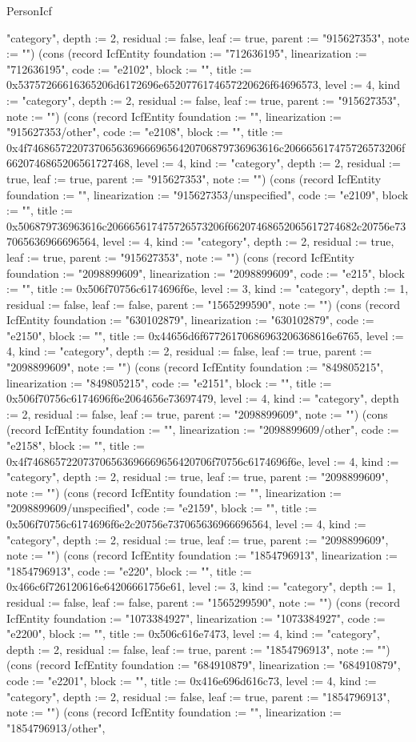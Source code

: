 \begin{lexlean}{PersonIcf}
\begin{semanticmodule}
{"category", depth := 2, residual := false, leaf := true, parent := "915627353", note := ""}) (cons (record IcfEntity {foundation := "712636195", linearization := "712636195", code := "e2102", block := "", title := 0x53757266616365206d6172696e6520776174657220626f64696573, level := 4, kind := "category", depth := 2, residual := false, leaf := true, parent := "915627353", note := ""}) (cons (record IcfEntity {foundation := "", linearization := "915627353/other", code := "e2108", block := "", title := 0x4f746865722073706563696669656420706879736963616c206665617475726573206f6620746865206561727468, level := 4, kind := "category", depth := 2, residual := true, leaf := true, parent := "915627353", note := ""}) (cons (record IcfEntity {foundation := "", linearization := "915627353/unspecified", code := "e2109", block := "", title := 0x506879736963616c206665617475726573206f66207468652065617274682c20756e737065636966696564, level := 4, kind := "category", depth := 2, residual := true, leaf := true, parent := "915627353", note := ""}) (cons (record IcfEntity {foundation := "2098899609", linearization := "2098899609", code := "e215", block := "", title := 0x506f70756c6174696f6e, level := 3, kind := "category", depth := 1, residual := false, leaf := false, parent := "1565299590", note := ""}) (cons (record IcfEntity {foundation := "630102879", linearization := "630102879", code := "e2150", block := "", title := 0x44656d6f67726170686963206368616e6765, level := 4, kind := "category", depth := 2, residual := false, leaf := true, parent := "2098899609", note := ""}) (cons (record IcfEntity {foundation := "849805215", linearization := "849805215", code := "e2151", block := "", title := 0x506f70756c6174696f6e2064656e73697479, level := 4, kind := "category", depth := 2, residual := false, leaf := true, parent := "2098899609", note := ""}) (cons (record IcfEntity {foundation := "", linearization := "2098899609/other", code := "e2158", block := "", title := 0x4f746865722073706563696669656420706f70756c6174696f6e, level := 4, kind := "category", depth := 2, residual := true, leaf := true, parent := "2098899609", note := ""}) (cons (record IcfEntity {foundation := "", linearization := "2098899609/unspecified", code := "e2159", block := "", title := 0x506f70756c6174696f6e2c20756e737065636966696564, level := 4, kind := "category", depth := 2, residual := true, leaf := true, parent := "2098899609", note := ""}) (cons (record IcfEntity {foundation := "1854796913", linearization := "1854796913", code := "e220", block := "", title := 0x466c6f726120616e64206661756e61, level := 3, kind := "category", depth := 1, residual := false, leaf := false, parent := "1565299590", note := ""}) (cons (record IcfEntity {foundation := "1073384927", linearization := "1073384927", code := "e2200", block := "", title := 0x506c616e7473, level := 4, kind := "category", depth := 2, residual := false, leaf := true, parent := "1854796913", note := ""}) (cons (record IcfEntity {foundation := "684910879", linearization := "684910879", code := "e2201", block := "", title := 0x416e696d616c73, level := 4, kind := "category", depth := 2, residual := false, leaf := true, parent := "1854796913", note := ""}) (cons (record IcfEntity {foundation := "", linearization := "1854796913/other", }
\end{semanticmodule}
\end{lexlean}
